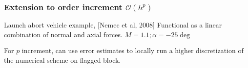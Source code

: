 \documentclass{beamer}
\begin{document}
\begin{frame}%
\frametitle{\LARGE Extension to order increment {$\mathcal{O}(h^p)$}}
\begin{minipage}[t][1\textheight]{1\textwidth}
\scriptsize
\vspace{-10pt}
\vspace{-10pt}
\hspace{10em}
\begin{exampleblock}{Launch abort vehicle example, [Nemec et al, 2008]}
\tiny
Functional as a linear combination of normal and axial forces. $M = 1.1; \alpha=-25\deg$
\vspace{-10pt}

\begin{figure}
\label{fig:LAVone}
\centering
{}
\end{figure}
\end{exampleblock}

For $p$ increment, can use error estimates to locally run a higher discretization of the numerical scheme on flagged block.

\end{minipage}

\end{frame}
\end{document}
